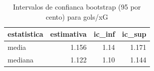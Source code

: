 \begin{table}

\caption{\label{tab:ic_bootstrap_g10}Intervalos de confianca bootstrap (95 por cento) para gols/xG}
\centering
\begin{tabular}[t]{lrrr}
\toprule
estatistica & estimativa & ic\_inf & ic\_sup\\
\midrule
media & 1.156 & 1.14 & 1.171\\
mediana & 1.122 & 1.10 & 1.144\\
\bottomrule
\end{tabular}
\end{table}
